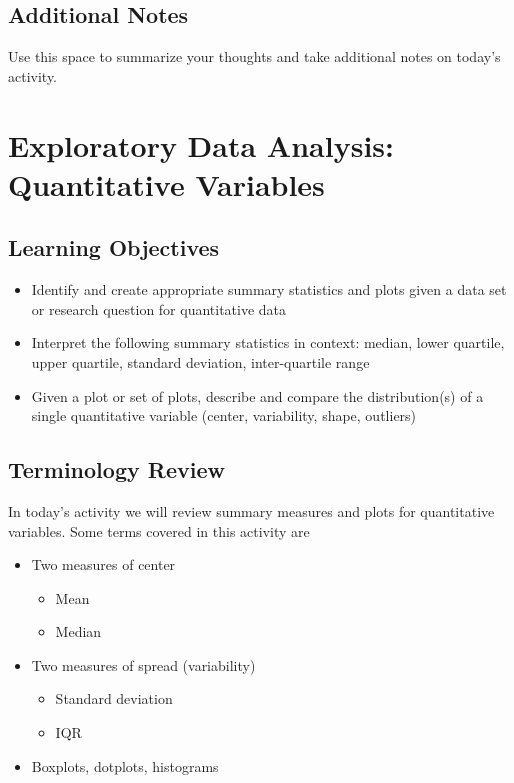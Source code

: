 \documentclass[
]{report}
\providecommand{\tightlist}{%
  \setlength{\itemsep}{0pt}\setlength{\parskip}{0pt}}
\begin{document}
\hypertarget{additional-notes}{%
\section{Additional Notes}\label{additional-notes}}

Use this space to summarize your thoughts and take additional notes on today's activity.

\hypertarget{exploratory-data-analysis-quantitative-variables}{%
\chapter{Exploratory Data Analysis: Quantitative Variables}\label{exploratory-data-analysis-quantitative-variables}}

\hypertarget{learning-objectives}{%
\section{Learning Objectives}\label{learning-objectives}}

\begin{itemize}
\item
  Identify and create appropriate summary statistics and plots
  given a data set or research question for quantitative data
\item
  Interpret the following summary statistics in context:
  median, lower quartile, upper quartile,
  standard deviation, inter-quartile range
\item
  Given a plot or set of plots, describe and compare the distribution(s)
  of a single quantitative variable
  (center, variability, shape, outliers)
\end{itemize}

\hypertarget{terminology-review}{%
\section{Terminology Review}\label{terminology-review}}

In today's activity we will review summary measures and plots for quantitative variables. Some terms covered in this activity are

\begin{itemize}
\tightlist
\item
  Two measures of center

  \begin{itemize}
  \tightlist
  \item
    Mean
  \item
    Median
  \end{itemize}
\item
  Two measures of spread (variability)

  \begin{itemize}
  \tightlist
  \item
    Standard deviation
  \item
    IQR
  \end{itemize}
\item
  Boxplots, dotplots, histograms
\end{itemize}
\end{document}
